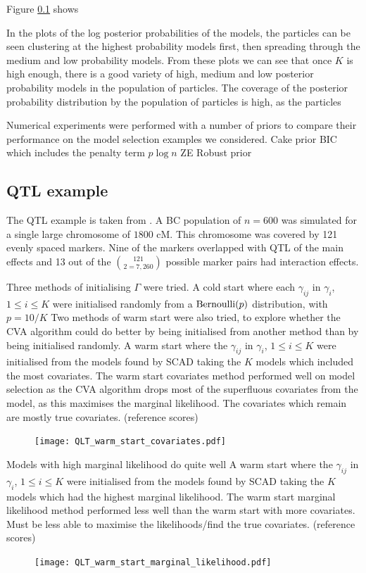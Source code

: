 \documentclass{amsart}[12pt]
\begin{document}
Figure \ref{} shows 

In the plots of the log posterior probabilities of the models, the particles can be seen clustering at the
highest probability models first, then spreading through the medium and low probability models. From these
plots we can see that once $K$ is high enough, there is a good variety of high, medium and low posterior
probability models in the population of particles. The coverage of the posterior probability distribution
by the population of particles is high, as the particles 

Numerical experiments were performed with a number of priors to compare their performance on the model
selection examples we considered.
Cake prior
BIC which includes the penalty term $p \log n$
ZE
Robust prior

\subsection{QTL example}
The QTL example is taken from \cite{Xu2007}. A BC population of $n=600$ was simulated for a single large
chromosome of $1800$ cM. This chromosome was covered by 121 evenly spaced markers. Nine of the markers
overlapped with QTL of the main effects and 13 out of the $121 \choose{2} = 7,260$ possible marker pairs had
interaction effects.

Three methods of initialising $\Gamma$ were tried.
A cold start where each $\gamma_{ij}$ in $\gamma_i$, $1 \leq i \leq K$ were initialised randomly from a
$\text{Bernoulli} (p)$ distribution, with $p = 10 / K$
Two methods of warm start were also tried, to explore whether the CVA algorithm could do better by being
initialised from another method than by being initialised randomly. 
A warm start where the $\gamma_{ij}$ in $\gamma_i$, $1 \leq i \leq K$ were initialised from the models
found by SCAD taking the $K$ models which included the most covariates.
The warm start covariates method performed well on model selection as the CVA algorithm drops most
of the superfluous covariates from the model, as this maximises the marginal likelihood. The covariates which 
remain are mostly true covariates. (reference scores)
\begin{figure}
\texttt{[image: QLT\_warm\_start\_covariates.pdf]}
\end{figure}

Models with high marginal likelihood do quite well
A warm start where the $\gamma_{ij}$ in $\gamma_i$, $1 \leq i \leq K$ were initialised from the models
found by SCAD taking the $K$ models which had the highest marginal likelihood.
The warm start marginal likelihood method performed less well than the warm start with more covariates.
Must be less able to maximise the likelihoods/find the true covariates.
(reference scores)
\begin{figure}
\texttt{[image: QLT\_warm\_start\_marginal\_likelihood.pdf]}
\end{figure}
\end{document}
